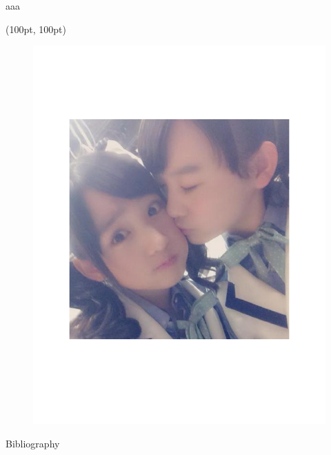 \documentclass[14pt,xcolor=dvipsnames,table,dvipdfmx]{beamer}
\begin{document}
\begin{frame}
aaa \cite{heurix_taxonomy_2015}
\end{frame}
\begin{frame}
	\begin{textblock*}{0.4\linewidth}(100pt, 100pt)
    		\begin{figure}
        		\centering
        		\includegraphics[width=0.8\linewidth,bb=0 0 460 460]{./output.pdf}
    		\end{figure}
	\end{textblock*}
\end{frame}
\begin{frame}[t,allowframebreaks]{Bibliography}


\end{frame}
\end{document}
